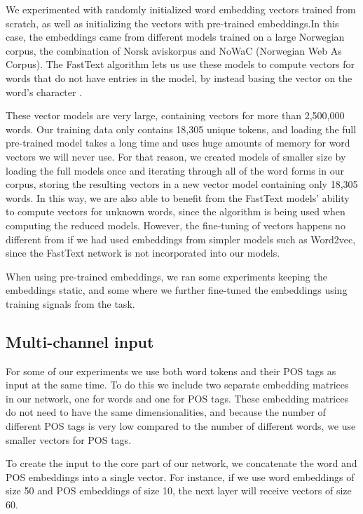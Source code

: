 We experimented with randomly initialized word embedding vectors trained from
scratch, as well as initializing the vectors with pre-trained embeddings.In
this case, the embeddings came from different models trained on a large
Norwegian corpus, the combination of Norsk aviskorpus and NoWaC (Norwegian
Web As Corpus). The FastText algorithm lets us use these models to compute
vectors for words that do not have entries in the model, by instead basing
the vector on the word's character \ngrams.

These vector models are very large, containing vectors for more than
2,500,000 words. Our training data only contains 18,305 unique tokens, and
loading the full pre-trained model takes a long time and uses huge amounts of
memory for word vectors we will never use. For that reason, we created models
of smaller size by loading the full models once and iterating through all of
the word forms in our corpus, storing the resulting vectors in a new vector
model containing only 18,305 words. In this way, we are also able to benefit
from the FastText models' ability to compute vectors for unknown words, since
the \ngram algorithm is being used when computing the reduced models.
However, the fine-tuning of vectors happens no different from if we had used
embeddings from simpler models such as Word2vec, since the FastText network
is not incorporated into our models.

When using pre-trained embeddings, we ran some experiments keeping the
embeddings static, and some where we further fine-tuned the embeddings using
training signals from the task.

\subsection{Multi-channel input}

For some of our experiments we use both word tokens and their POS tags as
input at the same time. To do this we include two separate embedding matrices
in our network, one for words and one for POS tags. These embedding matrices
do not need to have the same dimensionalities, and because the number of
different POS tags is very low compared to the number of different words, we
use smaller vectors for POS tags.

To create the input to the core part of our network, we concatenate the word
and POS embeddings into a single vector. For instance, if we use word
embeddings of size 50 and POS embeddings of size 10, the next layer will
receive vectors of size 60.


